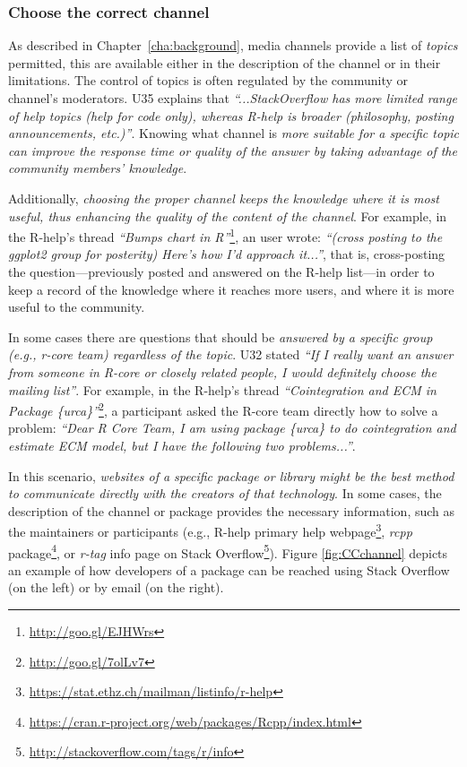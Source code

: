 \documentclass{sig-alternate-05-2015}
\begin{document}
	\subsubsection{Choose the correct channel}

		As described in Chapter~\ref{cha:background}, media channels provide a list of \textit{topics} permitted, this are available either in the description of the channel or in their limitations.
		The control of topics is often regulated by the community or channel's moderators.
		U35 explains that \textit{``...StackOverflow has more limited range of help topics (help for code only), whereas R-help is broader (philosophy, posting announcements, etc.)''}.
		Knowing what channel is \emph{more suitable for a specific topic can improve the response time or quality of the answer by taking advantage of the community members' knowledge}.

		Additionally, \emph{choosing the proper channel keeps the knowledge where it is most useful, thus enhancing the quality of the content of the channel}.
		For example, in the R-help's thread \textit{``Bumps chart in R''}\footnote{\url{http://goo.gl/EJHWrs}}, an user wrote: \textit{``(cross posting to the ggplot2 group for posterity) Here's how I'd approach it...''}, that is, cross-posting the question---previously posted and answered on the R-help list---in order to keep a record of the knowledge where it reaches more users, and where it is more useful to the community.

		In some cases there are questions that should be \emph{answered by a \textit{specific group} (e.g., r-core team) regardless of the topic}.
		U32 stated \textit{``If I really want an answer from someone in R-core or closely related people, I would definitely choose the mailing list''}.
		For example, in the R-help's thread \textit{``Cointegration and ECM in Package \{urca\}''}\footnote{\url{http://goo.gl/7olLv7}}, a participant asked the R-core team directly how to solve a problem: \textit{``Dear R Core Team, I am using package \{urca\} to do cointegration and estimate ECM model, but I have the following two problems...''}.

		In this scenario, \emph{websites of a specific package or library might be the best method to communicate directly with the creators of that technology}.
		In some cases, the description of the channel or package provides the necessary information, such as the maintainers or participants (e.g., R-help primary help webpage\footnote{\url{https://stat.ethz.ch/mailman/listinfo/r-help}}, \emph{rcpp} package\footnote{\url{https://cran.r-project.org/web/packages/Rcpp/index.html}}, or \textit{r-tag} info page on Stack Overflow\footnote{\url{http://stackoverflow.com/tags/r/info}}).
		Figure \ref{fig:CCchannel} depicts an example of how developers of a package can be reached using Stack Overflow (on the left) or by email (on the right). 
\end{document}
